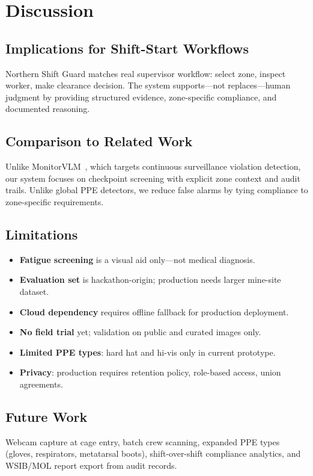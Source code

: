 \section{Discussion}
\label{sec:discussion}

\subsection{Implications for Shift-Start Workflows}

Northern Shift Guard matches real supervisor workflow: select zone, inspect worker, make clearance decision. The system supports---not replaces---human judgment by providing structured evidence, zone-specific compliance, and documented reasoning.

\subsection{Comparison to Related Work}

Unlike MonitorVLM~\cite{monitorvlm2025}, which targets continuous surveillance violation detection, our system focuses on checkpoint screening with explicit zone context and audit trails. Unlike global PPE detectors, we reduce false alarms by tying compliance to zone-specific requirements.

\subsection{Limitations}

\begin{itemize}
  \item \textbf{Fatigue screening} is a visual aid only---not medical diagnosis.
  \item \textbf{Evaluation set} is hackathon-origin; production needs larger mine-site dataset.
  \item \textbf{Cloud dependency} requires offline fallback for production deployment.
  \item \textbf{No field trial} yet; validation on public and curated images only.
  \item \textbf{Limited PPE types}: hard hat and hi-vis only in current prototype.
  \item \textbf{Privacy}: production requires retention policy, role-based access, union agreements.
\end{itemize}

\subsection{Future Work}

Webcam capture at cage entry, batch crew scanning, expanded PPE types (gloves, respirators, metatarsal boots), shift-over-shift compliance analytics, and WSIB/MOL report export from audit records.
